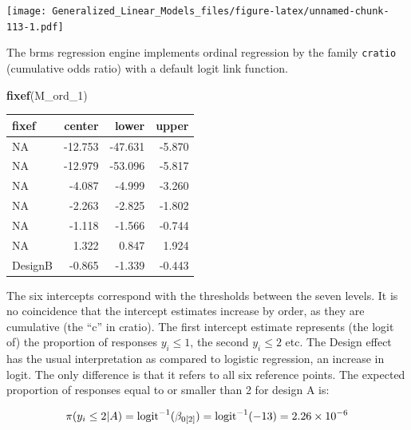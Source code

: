 \documentclass[]{svmono}
\newenvironment{Shaded}{\begin{snugshade}}{\end{snugshade}}
\newcommand{\KeywordTok}[1]{\textcolor[rgb]{0.13,0.29,0.53}{\textbf{#1}}}
\newcommand{\DataTypeTok}[1]{\textcolor[rgb]{0.13,0.29,0.53}{#1}}
\newcommand{\DecValTok}[1]{\textcolor[rgb]{0.00,0.00,0.81}{#1}}
\newcommand{\StringTok}[1]{\textcolor[rgb]{0.31,0.60,0.02}{#1}}
\newcommand{\OperatorTok}[1]{\textcolor[rgb]{0.81,0.36,0.00}{\textbf{#1}}}
\newcommand{\NormalTok}[1]{#1}
\theoremstyle{definition}
\theoremstyle{definition}
\theoremstyle{definition}
\theoremstyle{remark}
\begin{document}
\texttt{[image: Generalized\_Linear\_Models\_files/figure-latex/unnamed-chunk-113-1.pdf]}

The brms regression engine implements ordinal regression by the family
\texttt{cratio} (cumulative odds ratio) with a default logit link
function.

\begin{Shaded}
\end{Shaded}

\begin{Shaded}
\begin{Highlighting}[]
\KeywordTok{fixef}\NormalTok{(M_ord_}\DecValTok{1}\NormalTok{)}
\end{Highlighting}
\end{Shaded}

\begin{longtable}[]{@{}lrrr@{}}
\toprule
fixef & center & lower & upper\tabularnewline
\midrule
\endhead
NA & -12.753 & -47.631 & -5.870\tabularnewline
NA & -12.979 & -53.096 & -5.817\tabularnewline
NA & -4.087 & -4.999 & -3.260\tabularnewline
NA & -2.263 & -2.825 & -1.802\tabularnewline
NA & -1.118 & -1.566 & -0.744\tabularnewline
NA & 1.322 & 0.847 & 1.924\tabularnewline
DesignB & -0.865 & -1.339 & -0.443\tabularnewline
\bottomrule
\end{longtable}

The six intercepts correspond with the thresholds between the seven
levels. It is no coincidence that the intercept estimates increase by
order, as they are cumulative (the ``c'' in cratio). The first intercept
estimate represents (the logit of) the proportion of responses
\(y_i \leq 1\), the second \(y_i \leq 2\) etc. The Design effect has the
usual interpretation as compared to logistic regression, an increase in
logit. The only difference is that it refers to all six reference
points. The expected proportion of responses equal to or smaller than 2
for design A is:

\[
\pi(y_i \leq 2|A) = \\
\text{logit}^{-1}(\beta_{0[2]}) = \\ 
\text{logit}^{-1}(-13) = \\
2.26\times 10^{-6}
\]
\end{document}
